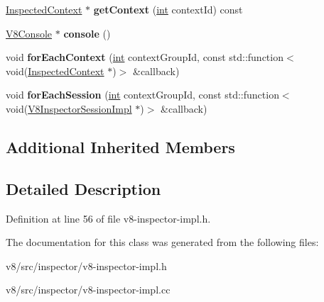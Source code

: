\begin{DoxyCompactItemize}
\item 
\mbox{\label{classv8__inspector_1_1V8InspectorImpl_a0698e6622137613b3114b71d5825fbad}} 
\mbox{\hyperlink{classv8__inspector_1_1InspectedContext}{Inspected\+Context}} $\ast$ {\bfseries get\+Context} (\mbox{\hyperlink{classint}{int}} context\+Id) const
\item 
\mbox{\label{classv8__inspector_1_1V8InspectorImpl_a6c32ba8a9e6693ace975bc476ada5275}} 
\mbox{\hyperlink{classv8__inspector_1_1V8Console}{V8\+Console}} $\ast$ {\bfseries console} ()
\item 
\mbox{\label{classv8__inspector_1_1V8InspectorImpl_ad78622a7280dd98f630263a013c1a441}} 
void {\bfseries for\+Each\+Context} (\mbox{\hyperlink{classint}{int}} context\+Group\+Id, const std\+::function$<$ void(\mbox{\hyperlink{classv8__inspector_1_1InspectedContext}{Inspected\+Context}} $\ast$)$>$ \&callback)
\item 
\mbox{\label{classv8__inspector_1_1V8InspectorImpl_ab1a6fbb376af67276b41d6b4fb9a88c5}} 
void {\bfseries for\+Each\+Session} (\mbox{\hyperlink{classint}{int}} context\+Group\+Id, const std\+::function$<$ void(\mbox{\hyperlink{classv8__inspector_1_1V8InspectorSessionImpl}{V8\+Inspector\+Session\+Impl}} $\ast$)$>$ \&callback)
\end{DoxyCompactItemize}
\subsection*{Additional Inherited Members}


\subsection{Detailed Description}


Definition at line 56 of file v8-\/inspector-\/impl.\+h.



The documentation for this class was generated from the following files\+:\begin{DoxyCompactItemize}
\item 
v8/src/inspector/v8-\/inspector-\/impl.\+h\item 
v8/src/inspector/v8-\/inspector-\/impl.\+cc\end{DoxyCompactItemize}
